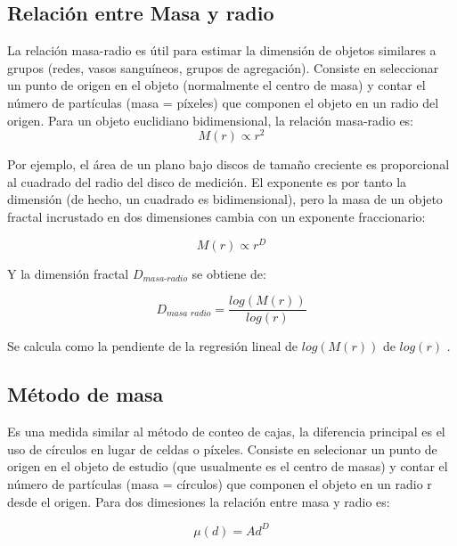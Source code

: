 \documentclass[11pt]{article}
\begin{document}
\subsection{Relaci\'{o}n entre Masa y radio}

La relaci\'{o}n masa-radio es \'{u}til para estimar la dimensi\'{o}n de objetos similares a grupos (redes, vasos sangu\'{i}neos, grupos de agregaci\'{o}n). Consiste en seleccionar un punto de origen en el objeto (normalmente el centro de masa) y contar el n\'{u}mero de part\'{i}culas (masa = p\'{i}xeles) que componen el objeto en un radio del origen. Para un objeto euclidiano bidimensional, la relaci\'{o}n masa-radio es:
\begin{equation}
M(r) \propto r^{2}
\end{equation}

Por ejemplo, el \'{a}rea de un plano bajo discos de tamaño creciente es proporcional al cuadrado del radio del disco de medici\'{o}n. El exponente es por tanto la dimensi\'{o}n (de hecho, un cuadrado es bidimensional), pero la masa de un objeto fractal incrustado en dos dimensiones cambia con un exponente fraccionario:

\begin{equation}
M(r) \propto r^{D} 
\end{equation}

Y la dimensi\'{o}n fractal $D_\textit{{masa-radio}}$ se obtiene de:

\begin{equation}
D_\textit{masa radio} = \frac{log (M(r))}{log (r)}
\end{equation}

Se calcula como la pendiente de la regresi\'{o}n lineal de $log(M(r))$ de $log(r)$ \cite{Mustafa1996}.


\subsection{M\'{e}todo de masa}

Es una medida similar al m\'{e}todo de conteo de cajas, la diferencia principal es el uso de c\'{i}rculos en lugar de celdas o p\'{i}xeles. Consiste en selecionar un punto de origen en el objeto de estudio (que usualmente es el centro de masas) y contar el n\'{u}mero de part\'{i}culas (masa = c\'{i}rculos) que componen 	el objeto en un radio r desde el origen. Para dos dimesiones la relaci\'{o}n entre masa y radio es:

\begin{equation}
\mu(d) = Ad^D
\end{equation}
\end{document}
